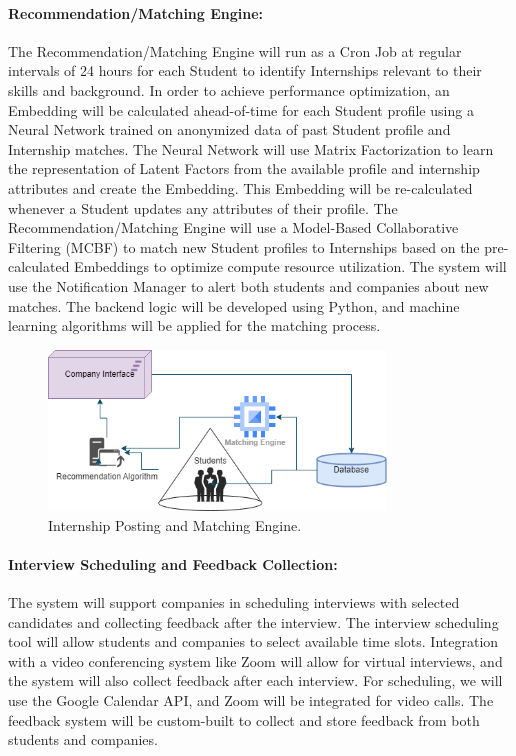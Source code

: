 \paragraph{Recommendation/Matching Engine:}
 The Recommendation/Matching Engine will run as a Cron Job at regular intervals of 24 hours for each Student to identify Internships relevant to their skills and background. In order to achieve performance optimization, an Embedding will be calculated ahead-of-time for each Student profile using a Neural Network trained on anonymized data of past Student profile and Internship matches. The Neural Network will use Matrix Factorization to learn the representation of Latent Factors from the available profile and internship attributes and create the Embedding. This Embedding will be re-calculated whenever a Student updates any attributes of their profile. The Recommendation/Matching Engine will use a Model-Based Collaborative Filtering (MCBF) to match new Student profiles to Internships based on the pre-calculated Embeddings to optimize compute resource utilization. The system will use the Notification Manager to alert both students and companies about new matches. The backend logic will be developed using Python, and machine learning algorithms will be applied for the matching process.

\begin{figure}[H]
\centering
\includegraphics[width=0.8\textwidth]{Images/core3.png}
\caption{Internship Posting and Matching Engine.}
\end{figure}

\paragraph{Interview Scheduling and Feedback Collection:}
The system will support companies in scheduling interviews with selected candidates and collecting feedback after the interview. The interview scheduling tool will allow students and companies to select available time slots. Integration with a video conferencing system like Zoom will allow for virtual interviews, and the system will also collect feedback after each interview. For scheduling, we will use the Google Calendar API, and Zoom will be integrated for video calls. The feedback system will be custom-built to collect and store feedback from both students and companies.

